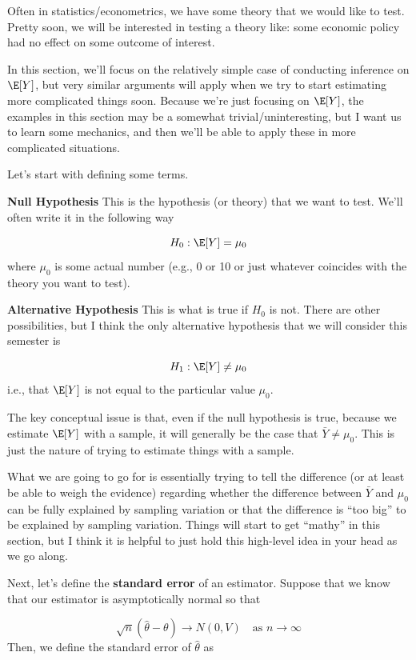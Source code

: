 \documentclass[
  letterpaper,
  DIV=11,
  numbers=noendperiod]{scrreprt}
\begin{document}
Often in statistics/econometrics, we have some theory that we would like
to test. Pretty soon, we will be interested in testing a theory like:
some economic policy had no effect on some outcome of interest.

In this section, we'll focus on the relatively simple case of conducting
inference on \(\E[Y]\), but very similar arguments will apply when we
try to start estimating more complicated things soon. Because we're just
focusing on \(\E[Y]\), the examples in this section may be a somewhat
trivial/uninteresting, but I want us to learn some mechanics, and then
we'll be able to apply these in more complicated situations.

Let's start with defining some terms.

\textbf{Null Hypothesis} This is the hypothesis (or theory) that we want
to test. We'll often write it in the following way

\[
  H_0 : \E[Y] = \mu_0
\] where \(\mu_0\) is some actual number (e.g., 0 or 10 or just whatever
coincides with the theory you want to test).

\textbf{Alternative Hypothesis} This is what is true if \(H_0\) is not.
There are other possibilities, but I think the only alternative
hypothesis that we will consider this semester is

\[
  H_1 : \E[Y] \neq \mu_0
\] i.e., that \(\E[Y]\) is not equal to the particular value \(\mu_0\).

The key conceptual issue is that, even if the null hypothesis is true,
because we estimate \(\E[Y]\) with a sample, it will generally be the
case that \(\bar{Y} \neq \mu_0\). This is just the nature of trying to
estimate things with a sample.

What we are going to go for is essentially trying to tell the difference
(or at least be able to weigh the evidence) regarding whether the
difference between \(\bar{Y}\) and \(\mu_0\) can be fully explained by
sampling variation or that the difference is ``too big'' to be explained
by sampling variation. Things will start to get ``mathy'' in this
section, but I think it is helpful to just hold this high-level idea in
your head as we go along.

Next, let's define the \textbf{standard error} of an estimator. Suppose
that we know that our estimator is asymptotically normal so that

\[
  \sqrt{n}(\hat{\theta} - \theta) \rightarrow N(0,V) \quad \textrm{as } n \rightarrow \infty
\] Then, we define the standard error of \(\hat{\theta}\) as
\end{document}
